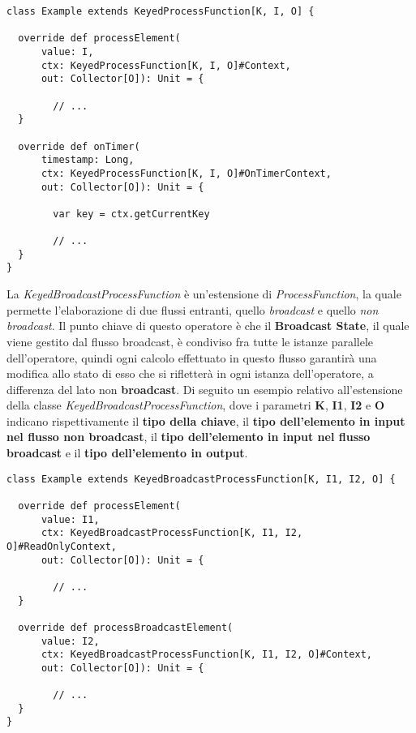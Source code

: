 \begin{verbatim}
class Example extends KeyedProcessFunction[K, I, O] {

  override def processElement(
      value: I, 
      ctx: KeyedProcessFunction[K, I, O]#Context, 
      out: Collector[O]): Unit = {
      
      	// ...
  }

  override def onTimer(
      timestamp: Long, 
      ctx: KeyedProcessFunction[K, I, O]#OnTimerContext, 
      out: Collector[O]): Unit = {
      
      	var key = ctx.getCurrentKey
      
      	// ...
  }
}
\end{verbatim}
La \textit{KeyedBroadcastProcessFunction} è un'estensione di \textit{ProcessFunction}, la quale permette l'elaborazione di due flussi entranti, quello \textit{broadcast} e quello \textit{non broadcast}. Il punto chiave di questo operatore è che il \textbf{Broadcast State}, il quale viene gestito dal flusso broadcast, è condiviso fra tutte le istanze parallele dell'operatore, quindi ogni calcolo effettuato in questo flusso garantirà una modifica allo stato di esso che si rifletterà in ogni istanza dell'operatore, a differenza del lato non \textbf{broadcast}. Di seguito un esempio relativo all'estensione della classe \textit{KeyedBroadcastProcessFunction}, dove i parametri \textbf{K}, \textbf{I1}, \textbf{I2} e \textbf{O} indicano rispettivamente il \textbf{tipo della chiave}, il \textbf{tipo dell'elemento in input nel flusso non broadcast}, il \textbf{tipo dell'elemento in input nel flusso broadcast} e il \textbf{tipo dell'elemento in output}.
\begin{verbatim}
class Example extends KeyedBroadcastProcessFunction[K, I1, I2, O] {

  override def processElement(
      value: I1, 
      ctx: KeyedBroadcastProcessFunction[K, I1, I2, O]#ReadOnlyContext, 
      out: Collector[O]): Unit = {
      
      	// ...
  }
  
  override def processBroadcastElement(
      value: I2, 
      ctx: KeyedBroadcastProcessFunction[K, I1, I2, O]#Context, 
      out: Collector[O]): Unit = {
      
      	// ...
  }
}
\end{verbatim}

